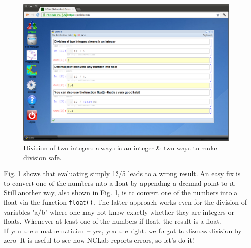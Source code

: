 \documentclass[article,A4,12pt]{llncs}
\begin{document}
\newpage
\begin{figure}[!ht]
\begin{center}
\includegraphics[width=\textwidth]{img/div1.png}
\end{center}
\caption{Division of two integers always is an integer \& two ways to make division safe.}
\label{fig:div1}
\end{figure}
\noindent
Fig. \ref{fig:div1} shows that evaluating simply 12/5 leads to a wrong result. An easy fix is 
to convert one of the numbers into a float by appending a decimal point to it. Still
another way, also shown in  Fig. \ref{fig:div1}, is to convert one of the numbers into a float 
via the function {\tt float()}. The latter approach works even for the division of variables "a/b"
where one may not know exactly whether they are integers or floats. Whenever at least 
one of the numbers if float, the result is a float. \\

\noindent
If you are a mathematician -- yes, you are right. we forgot to discuss division by zero. 
It is useful to see how NCLab reports errors, so let's do it!
\end{document}
